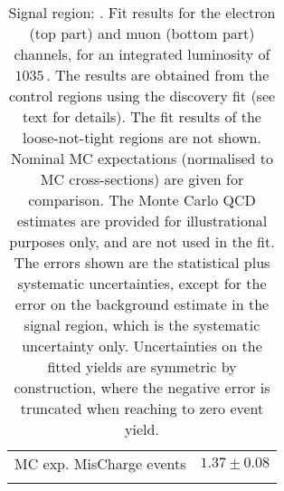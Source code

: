 \begin{table}
\begin{center}
{\begin{tabular*}{\textwidth}{@{\extracolsep{\fill}}lr}
        MC exp. MisCharge events         & $1.37 \pm 0.08$              \\
\noalign{\smallskip}\hline\noalign{\smallskip}
\end{tabular*}
}
\end{center}
\caption{Signal region: . Fit results for the electron (top part) and muon (bottom part) channels, for an integrated luminosity of $1035$\,\ipb.
The results are obtained from the control regions using the discovery fit (see text for details). The fit results of the loose-not-tight regions are not shown.
Nominal MC expectations (normalised to MC cross-sections) are given for comparison. 
The Monte Carlo QCD estimates are provided for illustrational purposes only, and are not used in the fit.
The errors shown are the statistical plus systematic uncertainties, except for the error on the background estimate in the signal region, which is the systematic uncertainty only.
Uncertainties on the fitted yields are symmetric by construction, 
where the negative error is truncated when reaching to zero event yield.
}
\label{table.results.systematics.in.logL.fit.table.results.yields}
\end{table}
%
